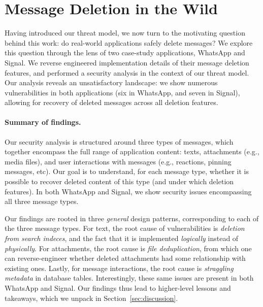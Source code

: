 \section{Message Deletion in the Wild}\label{sec:attacks}
Having introduced our threat model, we now turn to the motivating question behind this work: do real-world applications safely delete messages? We explore this question through the lens of two case-study applications, WhatsApp and Signal. We reverse engineered implementation details of their message deletion features, and performed a security analysis in the context of our threat model. Our analysis reveals an unsatisfactory landscape: we show numerous vulnerabilities in both applications (six in WhatsApp, and seven in Signal), allowing for recovery of deleted messages across all deletion features. 



\paragraph{Summary of findings.} Our security analysis is structured around three types of messages, which together encompass the full range of application content: texts, attachments (e.g., media files), and user interactions with messages (e.g., reactions, pinning messages, etc). Our goal is to understand, for each message type, whether it is possible to recover deleted content of this type (and under which deletion features). In both WhatsApp and Signal, we show security issues encompassing all three message types.

Our findings are rooted in three \emph{general} design patterns, corresponding to each of the three message types. For text, the root cause of vulnerabilities is \emph{deletion from search indeces}, and the fact that it is implemented \emph{logically} instead of \emph{physically}. For attachments, the root cause is \emph{file deduplication}, from which one can reverse-engineer whether deleted attachments had some relationship with existing ones. Lastly, for message interactions, the root cause is \emph{straggling metadata} in database tables. Interestingly, these same issues are present in both WhatsApp and Signal. Our findings thus lead to higher-level lessons and takeaways, which we unpack in Section~\ref{sec:discussion}.

